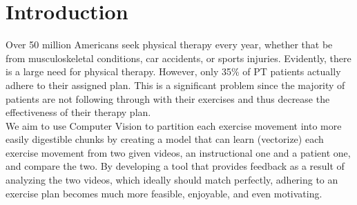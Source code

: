 \section{Introduction}
\label{sec:intro}

\indent Over 50 million Americans seek physical therapy every year, whether that be from 
musculoskeletal conditions, car accidents, or sports injuries. Evidently, there is a large
need for physical therapy\cite{Authors14i}. However, only 35\% of PT patients actually adhere to their assigned 
plan\cite{Authors14h}. This is a significant problem since the majority of patients are not following 
through with their exercises and thus decrease the effectiveness of their therapy plan.
\\
\indent We aim to use Computer Vision to partition each exercise movement into more easily digestible chunks 
by creating a model that can learn (vectorize) each exercise movement from two given videos, an instructional 
one and a patient one, and compare the two. By developing a tool that provides feedback as a result of analyzing 
the two videos, which ideally should match perfectly, adhering to an exercise plan 
becomes much more feasible, enjoyable, and even motivating.

